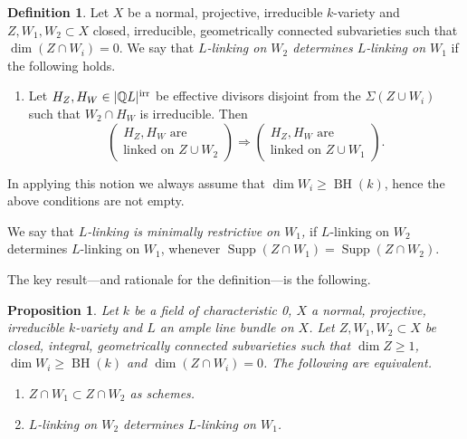 \documentclass{amsart}
\newtheorem{prop}[thm]{Proposition}
\theoremstyle{definition}
\newtheorem{defn}[thm]{Definition}
\theoremstyle{remark}
\newcommand{\q}[0]{{\mathbb Q}}
\newcommand{\supp}[0]{\operatorname{Supp}}
\newcommand{\BH}[0]{\operatorname{BH}}
\begin{document}
\begin{defn} \label{red.int.top.prop.defn}
Let $X$ be a  normal, projective, irreducible  $k$-variety and
$Z, W_1, W_2\subset X$ closed, irreducible, geometrically connected  subvarieties
such that  $\dim (Z\cap W_i)=0$. 
We say that  {\it $L$-linking on  $W_2$  determines $L$-linking on  $W_1$} if 
the following holds.
\begin{enumerate}
\item Let  $H_Z, H_W\in |\q L|^{\rm irr}$ be   effective  divisors disjoint from the $\Sigma(Z\cup W_i)$ such that $W_2\cap H_W$ is irreducible. Then 
$$
\left(
\begin{array}{c}
H_Z, H_W \mbox{ are}\\
\mbox{linked on } Z\cup W_2
\end{array}
\right)
\Rightarrow
\left(
\begin{array}{c}
H_Z, H_W \mbox{ are}\\
\mbox{linked on } Z\cup W_1
\end{array}
\right).
$$
\end{enumerate}
In applying this notion we always assume that $\dim W_i\geq \BH(k)$, hence the above conditions are not empty. 

We say that   {\it $L$-linking is minimally restrictive on  $W_1$,}
if  $L$-linking on  $W_2$  determines $L$-linking on  $W_1$, whenever
$\supp (Z\cap W_1)=\supp (Z\cap W_2)$. 
\end{defn}


The key result---and rationale for the definition---is the following.



\begin{prop}\label{red.int.top.prop}
 Let $k$ be a field of characteristic 0,
 $X$  a  normal, projective, irreducible  $k$-variety  and $L$  an ample line bundle  on $X$. Let $Z, W_1, W_2\subset X$ be closed, integral, geometrically connected  subvarieties
such that  $\dim Z\geq 1$,  $\dim W_i\geq \BH(k)$  and $\dim (Z\cap W_i)=0$. 
The following are equivalent.
\begin{enumerate}
\item $Z\cap W_1\subset Z\cap W_2$  as schemes.
\item  $L$-linking on  $W_2$  determines $L$-linking on  $W_1$.
\end{enumerate}
\end{prop}
\end{document}

